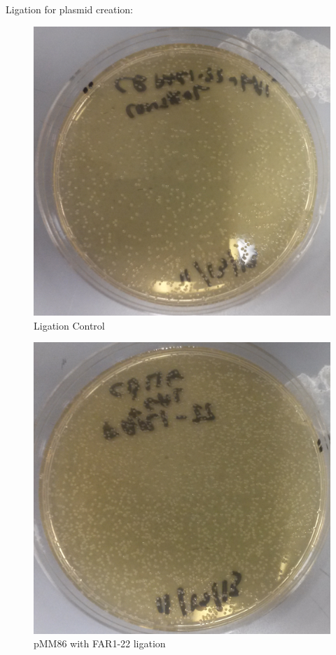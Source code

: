 \documentclass{beamer}
\begin{document}
\begin{frame}{Ligation for plasmid creation:}
    \begin{minipage}[ht!]{0.48\textwidth}
        \begin{figure}[ht!]
            \centering
            \includegraphics[width=.8\textwidth]{LigControl.png}
            \caption{Ligation Control}
            \label{fig:ligc}
        \end{figure}
    \end{minipage}
    \hfill
    \begin{minipage}[ht!]{0.48\textwidth}
        \begin{figure}[ht!]
            \centering
            \includegraphics[width=.8\textwidth]{LigVecIns.png}
            \caption{pMM86 with FAR1-22 ligation}
            \label{fig:lig1}
        \end{figure}
    \end{minipage}
\end{frame}
\end{document}
